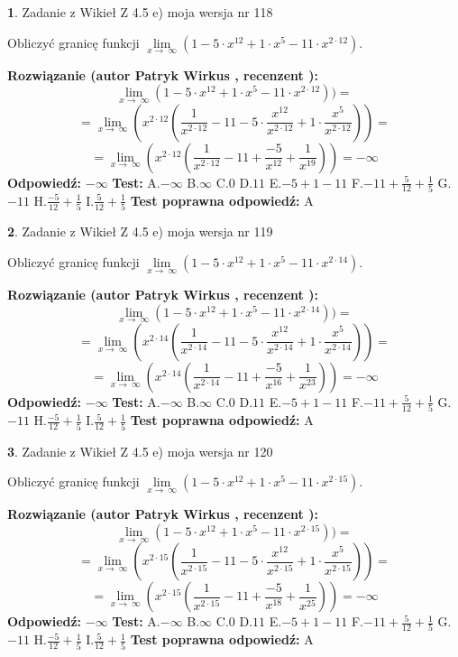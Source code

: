 \documentclass[12pt, a4paper]{article}
\theoremstyle{definition} %
\newtheorem{zad}{}
\newcommand{\zadStart}[1]{\begin{zad}#1\newline}
\newcommand{\zadStop}{\end{zad}}
\newcommand{\rozwStart}[2]{\noindent \textbf{Rozwiązanie (autor #1 , recenzent #2): }\newline}
\newcommand{\rozwStop}{\newline}
\newcommand{\odpStart}{\noindent \textbf{Odpowiedź:}\newline}
\newcommand{\odpStop}{\newline}
\newcommand{\testStart}{\noindent \textbf{Test:}\newline}
\newcommand{\testStop}{\newline}
\newcommand{\kluczStart}{\noindent \textbf{Test poprawna odpowiedź:}\newline}
\newcommand{\kluczStop}{\newline}
\begin{document}
\zadStart{Zadanie z Wikieł Z 4.5 e) moja wersja nr 118}



Obliczyć granicę funkcji  $\lim\limits_{x\to\ \infty}(1 - 5 \cdot x^{12}+1 \cdot x^{5}- 11 \cdot x^{2\cdot12})$.
\zadStop
\rozwStart{Patryk Wirkus}{}
$$\lim\limits_{x\to\ \infty}(1 - 5 \cdot x^{12}+1 \cdot x^{5}- 11 \cdot x^{2\cdot12}))=$$
$$=\lim\limits_{x\to\ \infty}(x^{2\cdot12}(\frac{1}{x^{2\cdot12}}-11 -5 \cdot \frac{x^{12}}{x^{2\cdot12}}+1 \cdot \frac{x^{5}}{x^{2\cdot12}}))=$$
$$=\lim\limits_{x\to\ \infty}(x^{2\cdot12}(\frac{1}{x^{2\cdot12}}-11 + \frac{-5}{x^{12}}+ \frac{1}{x^{19}}))=-\infty$$
\rozwStop
\odpStart
$-\infty$
\odpStop
\testStart
A.$-\infty$ B.$\infty$ C.$0$ D.$11$ E.$-5 + 1 - 11$
F.$-11+\frac{5}{12}+\frac{1}{5}$ G.$-11$
H.$\frac{-5}{12}+\frac{1}{5}$
I.$\frac{5}{12}+\frac{1}{5}$
\testStop
\kluczStart
A
\kluczStop



\zadStart{Zadanie z Wikieł Z 4.5 e) moja wersja nr 119}



Obliczyć granicę funkcji  $\lim\limits_{x\to\ \infty}(1 - 5 \cdot x^{12}+1 \cdot x^{5}- 11 \cdot x^{2\cdot14})$.
\zadStop
\rozwStart{Patryk Wirkus}{}
$$\lim\limits_{x\to\ \infty}(1 - 5 \cdot x^{12}+1 \cdot x^{5}- 11 \cdot x^{2\cdot14}))=$$
$$=\lim\limits_{x\to\ \infty}(x^{2\cdot14}(\frac{1}{x^{2\cdot14}}-11 -5 \cdot \frac{x^{12}}{x^{2\cdot14}}+1 \cdot \frac{x^{5}}{x^{2\cdot14}}))=$$
$$=\lim\limits_{x\to\ \infty}(x^{2\cdot14}(\frac{1}{x^{2\cdot14}}-11 + \frac{-5}{x^{16}}+ \frac{1}{x^{23}}))=-\infty$$
\rozwStop
\odpStart
$-\infty$
\odpStop
\testStart
A.$-\infty$ B.$\infty$ C.$0$ D.$11$ E.$-5 + 1 - 11$
F.$-11+\frac{5}{12}+\frac{1}{5}$ G.$-11$
H.$\frac{-5}{12}+\frac{1}{5}$
I.$\frac{5}{12}+\frac{1}{5}$
\testStop
\kluczStart
A
\kluczStop



\zadStart{Zadanie z Wikieł Z 4.5 e) moja wersja nr 120}



Obliczyć granicę funkcji  $\lim\limits_{x\to\ \infty}(1 - 5 \cdot x^{12}+1 \cdot x^{5}- 11 \cdot x^{2\cdot15})$.
\zadStop
\rozwStart{Patryk Wirkus}{}
$$\lim\limits_{x\to\ \infty}(1 - 5 \cdot x^{12}+1 \cdot x^{5}- 11 \cdot x^{2\cdot15}))=$$
$$=\lim\limits_{x\to\ \infty}(x^{2\cdot15}(\frac{1}{x^{2\cdot15}}-11 -5 \cdot \frac{x^{12}}{x^{2\cdot15}}+1 \cdot \frac{x^{5}}{x^{2\cdot15}}))=$$
$$=\lim\limits_{x\to\ \infty}(x^{2\cdot15}(\frac{1}{x^{2\cdot15}}-11 + \frac{-5}{x^{18}}+ \frac{1}{x^{25}}))=-\infty$$
\rozwStop
\odpStart
$-\infty$
\odpStop
\testStart
A.$-\infty$ B.$\infty$ C.$0$ D.$11$ E.$-5 + 1 - 11$
F.$-11+\frac{5}{12}+\frac{1}{5}$ G.$-11$
H.$\frac{-5}{12}+\frac{1}{5}$
I.$\frac{5}{12}+\frac{1}{5}$
\testStop
\kluczStart
A
\kluczStop
\end{document}
